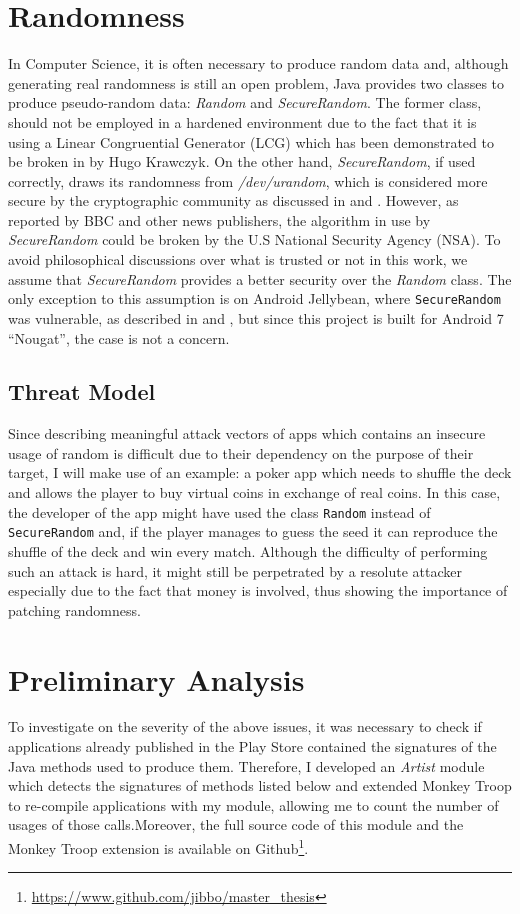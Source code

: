 \newpage
\section{Randomness}
\label{sec:randominvestigation}
In Computer Science, it is often necessary to produce random data and, although generating real randomness is still an open problem, Java provides two classes to produce pseudo-random data: \emph{Random} and \emph{SecureRandom}. The former class, should not be employed in a hardened environment due to the fact that it is using a Linear Congruential Generator (LCG) which has been demonstrated to be broken in \cite{lcgbreak} by Hugo Krawczyk. On the other hand, \emph{SecureRandom}, if used correctly, draws its randomness from \emph{/dev/urandom}, which is considered more secure by the cryptographic community as discussed in \cite{secrandom} and \cite{urandom}. However, as reported by BBC\cite{bbc} and other news publishers, the algorithm in use by \emph{SecureRandom} could be broken by the U.S National Security Agency (NSA). To avoid philosophical discussions over what is trusted or not in this work, we assume that \emph{SecureRandom} provides a better security over the \emph{Random} class. The only exception to this assumption is on Android Jellybean, where \texttt{SecureRandom} was vulnerable, as described in \cite{bitcoinalert} and \cite{randomalert}, but since this project is built for Android 7 \enquote{Nougat}, the case is not a concern.

\subsection{Threat Model}
Since describing meaningful attack vectors of apps which contains an insecure usage of random is difficult due to their dependency on the purpose of their target, I will make use of an example: a poker app which needs to shuffle the deck and allows the player to buy virtual coins in exchange of real coins. In this case, the developer of the app might have used the class \texttt{Random} instead of \texttt{SecureRandom} and, if the player manages to guess the seed it can reproduce the shuffle of the deck and win every match. Although the difficulty of performing such an attack is hard, it might still be perpetrated by a resolute attacker especially due to the fact that money is involved, thus showing the importance of patching randomness.

\section{Preliminary Analysis}
\label{sc:preliminaryanalysis}
To investigate on the severity of the above issues, it was necessary to check if applications already published in the Play Store contained the signatures of the Java methods used to produce them. Therefore, I developed an \emph{Artist} module which detects the signatures of methods listed below and extended Monkey Troop to re-compile applications with my module, allowing me to count the number of usages of those calls.\newpage Moreover, the full source code of this module and the Monkey Troop extension is available on Github\footnote{\url{https://www.github.com/jibbo/master_thesis}}.

